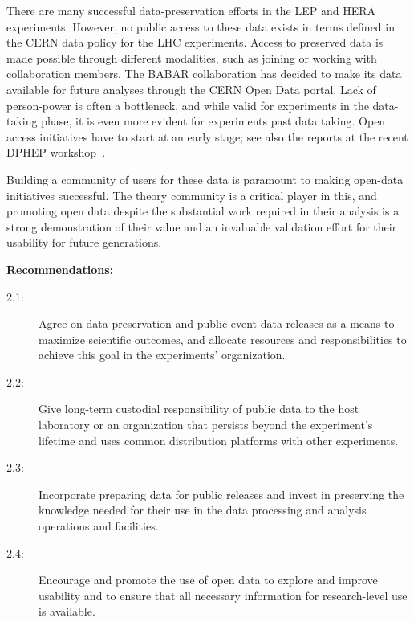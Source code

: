 \documentclass[11pt]{article}
\begin{document}

There are many successful data-preservation efforts in the LEP and HERA experiments. However, no public access to these data exists in terms defined in the CERN data policy for the LHC experiments. Access to preserved data is made possible through different modalities, such as joining or working with collaboration members. The BABAR collaboration has decided to make its data available for future analyses through the CERN Open Data portal. Lack of person-power is often a bottleneck, and while valid for experiments in the data-taking phase, it is even more evident for experiments past data taking. Open access initiatives have to start at an early stage; see also the reports at the recent DPHEP workshop~\cite{DPHEPws:2021}.

Building a community of users for these data is paramount to making open-data initiatives successful. The theory community is a critical player in this, and promoting open data despite the substantial work required in their analysis is a strong demonstration of their value and an invaluable validation effort for their usability for future generations.

\noindent
\textbf{Recommendations:}
\begin{description}
   \item[2.1:] Agree on data preservation and public event-data releases as a means to maximize scientific outcomes, and allocate resources and responsibilities to achieve this goal in the experiments' organization.    \item[2.2:] Give long-term custodial responsibility of public data to the host laboratory or an organization that persists beyond the experiment's lifetime and uses common distribution platforms with other experiments.
   \item[2.3:] Incorporate preparing data for public releases and invest in preserving the knowledge needed for their use in the data processing and analysis operations and facilities.
   \item[2.4:] Encourage and promote the use of open data to explore and improve usability and to ensure that all necessary information for research-level use is available.
\end{description}



\end{document}
